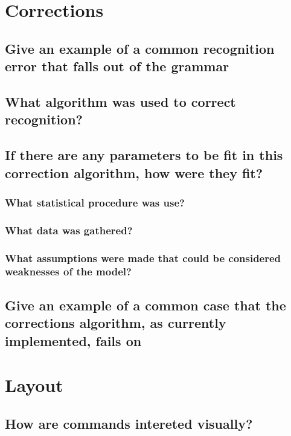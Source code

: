 \documentclass[]{article}
\begin{document}
\section{Corrections}

\subsection{Give an example of a common recognition error that falls out of the grammar}

\subsection{What algorithm was used to correct recognition?}

\subsection{If there are any parameters to be fit in this correction algorithm, how were they fit?}

\subsubsection{What statistical procedure was use?}

\subsubsection{What data was gathered?}

\subsubsection{What assumptions were made that could be considered weaknesses of the model?}

\subsection{Give an example of a common case that the corrections algorithm, as currently implemented, fails on}


\section{Layout}

\subsection{How are commands intereted visually?}
\end{document}
